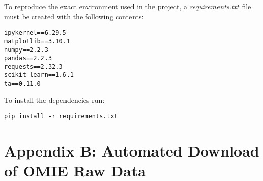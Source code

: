 \documentclass[12pt]{report} %
\begin{document}
\noindent To reproduce the exact environment used in the project, a \textit{requirements.txt} file must be created with the following contents:
\begin{verbatim}
ipykernel==6.29.5
matplotlib==3.10.1
numpy==2.2.3
pandas==2.2.3
requests==2.32.3
scikit-learn==1.6.1
ta==0.11.0
\end{verbatim}

\noindent To install the dependencies run:
\begin{verbatim}
pip install -r requirements.txt 
\end{verbatim}



\chapter* {Appendix B: Automated Download of OMIE Raw Data}
\label{app:appendix_b_data_scrapping}
\end{document}
